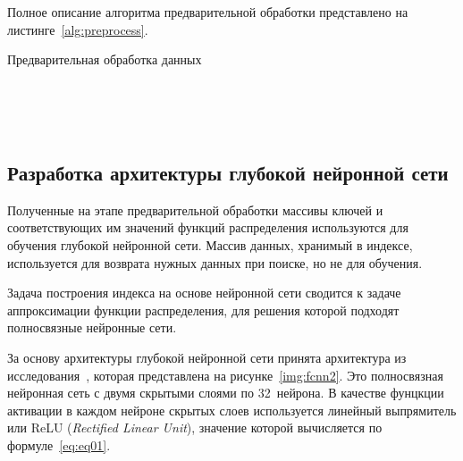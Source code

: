 Полное описание алгоритма предварительной обработки представлено на
листинге~\ref{alg:preprocess}.

\begin{algorithm}
    \caption{Предварительная обработка данных ~~~~~~~~~~~~~~~~~~~~}
    \label{alg:preprocess}
    \small


\end{algorithm}

~\\
~\\
~\\
\subsection{Разработка архитектуры глубокой нейронной сети\label{dnn}}

Полученные на этапе предварительной обработки массивы ключей и соответствующих
им значений функций распределения используются для обучения глубокой нейронной
сети. Массив данных, хранимый в индексе, используется для возврата нужных
данных при поиске, но не для обучения.

Задача построения индекса на основе нейронной сети сводится к задаче
аппроксимации функции распределения, для решения которой подходят полносвязные
нейронные сети.

За основу архитектуры глубокой нейронной сети принята архитектура из
исследования~\cite{main}, которая представлена на рисунке~\ref{img:fcnn2}.  Это
полносвязная нейронная сеть с двумя скрытыми слоями по 32~нейрона.  В качестве
фунцкции активации в каждом нейроне скрытых слоев используется линейный
выпрямитель или ReLU (\textit{Rectified Linear Unit}), значение которой
вычисляется по формуле~\ref{eq:eq01}.

